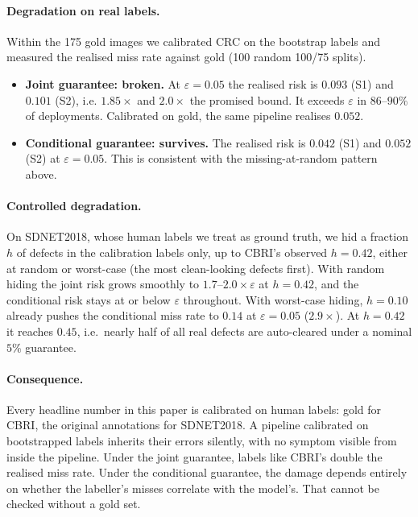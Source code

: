 \paragraph{Degradation on real labels.}
Within the 175 gold images we calibrated CRC on the bootstrap labels and
measured the realised miss rate against gold (100 random 100/75 splits).
\begin{itemize}
  \item \textbf{Joint guarantee: broken.} At $\varepsilon = 0.05$ the realised
  risk is $0.093$ (S1) and $0.101$ (S2), i.e. $1.85\times$ and $2.0\times$ the
  promised bound. It exceeds $\varepsilon$ in $86$--$90\%$ of deployments.
  Calibrated on gold, the same pipeline realises $0.052$.
  \item \textbf{Conditional guarantee: survives.} The realised risk is $0.042$
  (S1) and $0.052$ (S2) at $\varepsilon = 0.05$. This is consistent with the
  missing-at-random pattern above.
\end{itemize}

\paragraph{Controlled degradation.}
On SDNET2018, whose human labels we treat as ground truth, we hid a
fraction $h$ of defects in the calibration labels only, up to CBRI's
observed $h = 0.42$, either at random or worst-case (the most
clean-looking defects first). With random hiding the joint risk grows
smoothly to $1.7$--$2.0\times\varepsilon$ at $h = 0.42$, and the conditional
risk stays at or below $\varepsilon$ throughout. With worst-case hiding,
$h = 0.10$ already pushes the conditional miss rate to $0.14$ at
$\varepsilon = 0.05$ ($2.9\times$). At $h = 0.42$ it reaches $0.45$, i.e.\
nearly half of all real defects are auto-cleared under a nominal $5\%$
guarantee.

\paragraph{Consequence.}
Every headline number in this paper is calibrated on human labels: gold
for CBRI, the original annotations for SDNET2018. A pipeline calibrated
on bootstrapped labels inherits their errors silently, with no symptom
visible from inside the pipeline. Under the joint guarantee, labels like
CBRI's double the realised miss rate. Under the conditional guarantee,
the damage depends entirely on whether the labeller's misses correlate
with the model's. That cannot be checked without a gold set.
